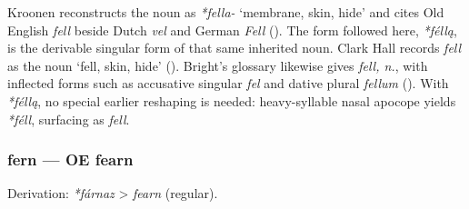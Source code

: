 \documentclass[
  british,
  a4paper,
]{article}
\begin{document}
Kroonen reconstructs the noun as \emph{*fella-} `membrane, skin, hide'
and cites Old English \emph{fell} beside Dutch \emph{vel} and German
\emph{Fell} (). The form
followed here, \emph{*féllą}, is the derivable singular form of that
same inherited noun. Clark Hall records \emph{fell} as the noun `fell,
skin, hide' ().
Bright's glossary likewise gives \emph{fell, n.}, with inflected forms
such as accusative singular \emph{fel} and dative plural \emph{fellum}
(). With
\emph{*féllą}, no special earlier reshaping is needed: heavy-syllable
nasal apocope yields \emph{*féll}, surfacing as \emph{fell}.

\subsubsection{fern --- OE fearn}\label{fern-oe-fearn}

Derivation: \emph{*fárnaz} \textgreater{} \emph{fearn} (regular).

\begingroup
\setlength{\fboxsep}{6pt}
\end{document}
